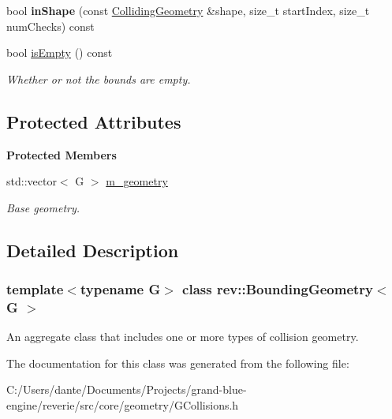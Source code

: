 \begin{Indent}
\begin{DoxyCompactItemize}
bool {\bfseries in\+Shape} (const \mbox{\hyperlink{classrev_1_1_colliding_geometry}{Colliding\+Geometry}} \&shape, size\+\_\+t start\+Index, size\+\_\+t num\+Checks) const
\item 
\mbox{\label{classrev_1_1_bounding_geometry_a1e3465733d76d44453e9e1f3aa4b5176}} 
bool \mbox{\hyperlink{classrev_1_1_bounding_geometry_a1e3465733d76d44453e9e1f3aa4b5176}{is\+Empty}} () const
\begin{DoxyCompactList}\small\item\em Whether or not the bounds are empty. \end{DoxyCompactList}\end{DoxyCompactItemize}
\end{Indent}
\subsection*{Protected Attributes}
\begin{Indent}\textbf{ Protected Members}\par
\begin{DoxyCompactItemize}
\item 
\mbox{\label{classrev_1_1_bounding_geometry_a92cbfed6b4a48c14dd0dbbb32dd2c23c}} 
std\+::vector$<$ G $>$ \mbox{\hyperlink{classrev_1_1_bounding_geometry_a92cbfed6b4a48c14dd0dbbb32dd2c23c}{m\+\_\+geometry}}
\begin{DoxyCompactList}\small\item\em Base geometry. \end{DoxyCompactList}\end{DoxyCompactItemize}
\end{Indent}


\subsection{Detailed Description}
\subsubsection*{template$<$typename G$>$\newline
class rev\+::\+Bounding\+Geometry$<$ G $>$}

An aggregate class that includes one or more types of collision geometry. 

The documentation for this class was generated from the following file\+:\begin{DoxyCompactItemize}
\item 
C\+:/\+Users/dante/\+Documents/\+Projects/grand-\/blue-\/engine/reverie/src/core/geometry/G\+Collisions.\+h\end{DoxyCompactItemize}
